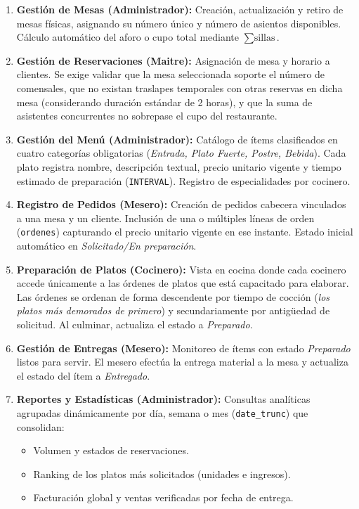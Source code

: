 \documentclass[11pt,letterpaper]{article}
\begin{document}
\begin{enumerate}[label=\textbf{CU-\arabic*:},leftmargin=*]
    \item \textbf{Gestión de Mesas (Administrador):} Creación, actualización y retiro de mesas físicas, asignando su número único y número de asientos disponibles. Cálculo automático del aforo o cupo total mediante $\sum \text{sillas}$.
    \item \textbf{Gestión de Reservaciones (Maitre):} Asignación de mesa y horario a clientes. Se exige validar que la mesa seleccionada soporte el número de comensales, que no existan traslapes temporales con otras reservas en dicha mesa (considerando duración estándar de 2 horas), y que la suma de asistentes concurrentes no sobrepase el cupo del restaurante.
    \item \textbf{Gestión del Menú (Administrador):} Catálogo de ítems clasificados en cuatro categorías obligatorias (\textit{Entrada, Plato Fuerte, Postre, Bebida}). Cada plato registra nombre, descripción textual, precio unitario vigente y tiempo estimado de preparación (\texttt{INTERVAL}). Registro de especialidades por cocinero.
    \item \textbf{Registro de Pedidos (Mesero):} Creación de pedidos cabecera vinculados a una mesa y un cliente. Inclusión de una o múltiples líneas de orden (\texttt{ordenes}) capturando el precio unitario vigente en ese instante. Estado inicial automático en \textit{Solicitado/En preparación}.
    \item \textbf{Preparación de Platos (Cocinero):} Vista en cocina donde cada cocinero accede únicamente a las órdenes de platos que está capacitado para elaborar. Las órdenes se ordenan de forma descendente por tiempo de cocción (\textit{los platos más demorados de primero}) y secundariamente por antigüedad de solicitud. Al culminar, actualiza el estado a \textit{Preparado}.
    \item \textbf{Gestión de Entregas (Mesero):} Monitoreo de ítems con estado \textit{Preparado} listos para servir. El mesero efectúa la entrega material a la mesa y actualiza el estado del ítem a \textit{Entregado}.
    \item \textbf{Reportes y Estadísticas (Administrador):} Consultas analíticas agrupadas dinámicamente por día, semana o mes (\texttt{date\_trunc}) que consolidan:
    \begin{itemize}
        \item Volumen y estados de reservaciones.
        \item Ranking de los platos más solicitados (unidades e ingresos).
        \item Facturación global y ventas verificadas por fecha de entrega.
    \end{itemize}
\end{enumerate}
\end{document}
